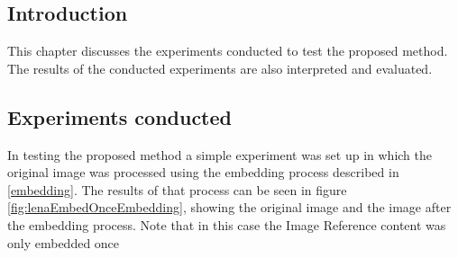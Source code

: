 \documentclass[12pt]{article}
\begin{document}
\subsection{Introduction}
This chapter discusses the experiments conducted to test the proposed method. 
The results of the conducted experiments are also interpreted and evaluated. 

\subsection{Experiments conducted}
\label{experimentsConducted}
In testing the proposed method a simple experiment was set up in which the original image was processed using the embedding process described in \ref{embedding}.
The results of that process can be seen in figure \ref{fig:lenaEmbedOnceEmbedding}, showing the original image and the image after the embedding process.
Note that in this case the Image Reference content was only embedded once
\end{document}
